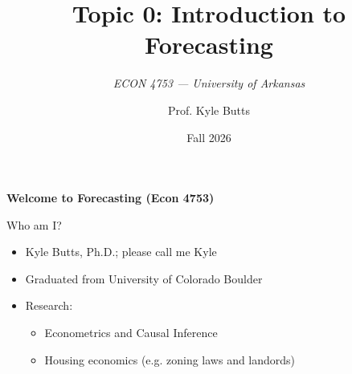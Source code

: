 \documentclass[aspectratio=169,t,11pt,table]{beamer}
\title{Topic 0: Introduction to Forecasting}
\subtitle{\it  ECON 4753 — University of Arkansas}
\date{Fall 2026}
\author{Prof. Kyle Butts}
\begin{document}
\begin{frame}
\maketitle

\end{frame}

\begin{frame}{}
  \bigskip\bigskip
  \begin{center}
    \alert{\LARGE\bf Welcome to Forecasting (Econ 4753)}
  \end{center}

  \bigskip\bigskip
  Who am I?
  \begin{itemize}
    \item Kyle Butts, Ph.D.; please call me Kyle
    
    \item Graduated from University of Colorado Boulder
    
    \item Research: 
    \begin{itemize}
      \item Econometrics and Causal Inference
      \item Housing economics (e.g. zoning laws and landords)
    \end{itemize}
  \end{itemize}
\end{frame}
\end{document}
